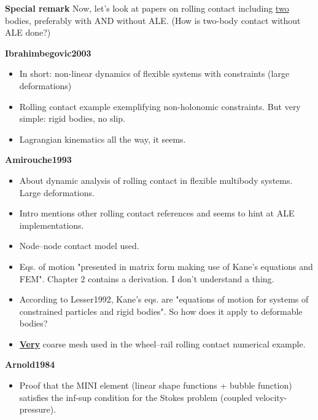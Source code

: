 \documentclass{article}
\begin{document}
\textbf{Special remark}
Now, let's look at papers on rolling contact including \underline{two} bodies, preferably with AND without ALE. (How is two-body contact without ALE done?)

\textbf{Ibrahimbegovic2003}
\begin{itemize}
\item In short: non-linear dynamics of flexible systems with constraints (large deformations)
\item Rolling contact example exemplifying non-holonomic constraints. But very simple: rigid bodies, no slip.
\item Lagrangian kinematics all the way, it seems.
\end{itemize}

\textbf{Amirouche1993}
\begin{itemize}
\item About dynamic analysis of rolling contact in flexible multibody systems. Large deformations.
\item Intro mentions other rolling contact references and seems to hint at ALE implementations.
\item Node--node contact model used.
\item Eqs. of motion "presented in matrix form making use of Kane's equations and FEM". Chapter 2 contains a derivation. I don't understand a thing.
\item According to Lesser1992, Kane's eqs. are "equations of motion for systems of constrained particles and rigid bodies". So how does it apply to deformable bodies?
\item \textbf{\underline{Very}} coarse mesh used in the wheel--rail rolling contact numerical example.
\end{itemize}

\textbf{Arnold1984}
\begin{itemize}
\item Proof that the MINI element (linear shape functions + bubble function) satisfies the inf-sup condition for the Stokes problem (coupled velocity-pressure).
\end{itemize}
\end{document}
